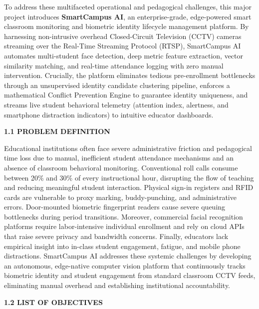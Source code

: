 \noindent To address these multifaceted operational and pedagogical challenges, this major project introduces \textbf{SmartCampus AI}, an enterprise-grade, edge-powered smart classroom monitoring and biometric identity lifecycle management platform. By harnessing non-intrusive overhead Closed-Circuit Television (CCTV) cameras streaming over the Real-Time Streaming Protocol (RTSP), SmartCampus AI automates multi-student face detection, deep metric feature extraction, vector similarity matching, and real-time attendance logging with zero manual intervention. Crucially, the platform eliminates tedious pre-enrollment bottlenecks through an unsupervised identity candidate clustering pipeline, enforces a mathematical Conflict Prevention Engine to guarantee identity uniqueness, and streams live student behavioral telemetry (attention index, alertness, and smartphone distraction indicators) to intuitive educator dashboards.

\vspace{0.2in}
\begin{flushleft}
{\fontsize{14pt}{18pt}\selectfont \textbf{1.1 PROBLEM DEFINITION}}\\[2mm]
\end{flushleft}

\noindent Educational institutions often face severe administrative friction and pedagogical time loss due to manual, inefficient student attendance mechanisms and an absence of classroom behavioral monitoring. Conventional roll calls consume between 20\% and 30\% of every instructional hour, disrupting the flow of teaching and reducing meaningful student interaction. Physical sign-in registers and RFID cards are vulnerable to proxy marking, buddy-punching, and administrative errors. Door-mounted biometric fingerprint readers cause severe queuing bottlenecks during period transitions. Moreover, commercial facial recognition platforms require labor-intensive individual enrollment and rely on cloud APIs that raise severe privacy and bandwidth concerns. Finally, educators lack empirical insight into in-class student engagement, fatigue, and mobile phone distractions. SmartCampus AI addresses these systemic challenges by developing an autonomous, edge-native computer vision platform that continuously tracks biometric identity and student engagement from standard classroom CCTV feeds, eliminating manual overhead and establishing institutional accountability.

\vspace{0.2in}
\begin{flushleft}
{\fontsize{14pt}{18pt}\selectfont \textbf{1.2 LIST OF OBJECTIVES}}\\[2mm]
\end{flushleft}


